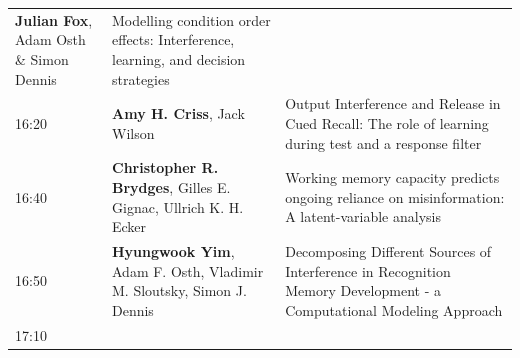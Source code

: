 \documentclass[]{article}
\begin{document}
\begin{longtable}[]{@{}lll@{}}
\begin{minipage}[t]{0.32\columnwidth}
\textbf{Julian Fox}, Adam Osth \& Simon Dennis\strut
\end{minipage} & \begin{minipage}[t]{0.57\columnwidth}\raggedright\strut
Modelling condition order effects: Interference, learning, and decision
strategies\strut
\end{minipage}\tabularnewline
\begin{minipage}[t]{0.03\columnwidth}\raggedright\strut
16:20\strut
\end{minipage} & \begin{minipage}[t]{0.32\columnwidth}\raggedright\strut
\textbf{Amy H. Criss}, Jack Wilson\strut
\end{minipage} & \begin{minipage}[t]{0.57\columnwidth}\raggedright\strut
Output Interference and Release in Cued Recall: The role of learning
during test and a response filter\strut
\end{minipage}\tabularnewline
\begin{minipage}[t]{0.03\columnwidth}\raggedright\strut
16:40\strut
\end{minipage} & \begin{minipage}[t]{0.32\columnwidth}\raggedright\strut
\textbf{Christopher R. Brydges}, Gilles E. Gignac, Ullrich K. H.
Ecker\strut
\end{minipage} & \begin{minipage}[t]{0.57\columnwidth}\raggedright\strut
Working memory capacity predicts ongoing reliance on misinformation: A
latent-variable analysis\strut
\end{minipage}\tabularnewline
\begin{minipage}[t]{0.03\columnwidth}\raggedright\strut
16:50\strut
\end{minipage} & \begin{minipage}[t]{0.32\columnwidth}\raggedright\strut
\textbf{Hyungwook Yim}, Adam F. Osth, Vladimir M. Sloutsky, Simon J.
Dennis\strut
\end{minipage} & \begin{minipage}[t]{0.57\columnwidth}\raggedright\strut
Decomposing Different Sources of Interference in Recognition Memory
Development - a Computational Modeling Approach\strut
\end{minipage}\tabularnewline
\begin{minipage}[t]{0.03\columnwidth}\raggedright\strut
17:10\strut
\end{minipage} & \begin{minipage}[t]{0.32\columnwidth}\raggedright\strut

\end{minipage}
\end{longtable}
\end{document}
